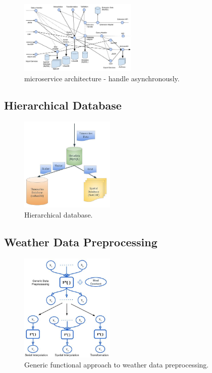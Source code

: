 \documentclass[conference]{IEEEtran}
\begin{document}
\begin{figure}[htbp]
\centerline{\includegraphics[width=0.5\textwidth]{method/microservice/microservice_architecture-handle_on_async-v3.jpg}}
\caption{microservice architecture - handle asynchronously.}
\label{fi:microservice_architecture_async}
\end{figure}

\subsection{Hierarchical Database}
\begin{figure}[htbp]
\centerline{\includegraphics[width=0.4\textwidth]{method/microservice/hierarchical_database.jpg}}
\caption{Hierarchical database.}
\label{fi:hierarchical_database}
\end{figure}

\subsection{Weather Data Preprocessing}
\begin{figure}[htbp]
\centerline{\includegraphics[width=0.4\textwidth]{method/data_preprocess/summary_weather_data_preprocessing.jpg}}
\caption{Generic functional approach to weather data preprocessing.}
\label{fi:summary_weather_data_preprocessing}
\end{figure}
\end{document}
